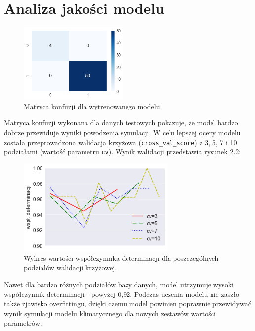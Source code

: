 \documentclass[11pt, a4paper, notitlepage]{report}
\begin{document}
\section{Analiza jakości modelu}
\begin{figure}[H]
	\centering
	\captionsetup{justification=centering}
	\includegraphics[width=200px]{graphics/conf_matrix}
	\caption{Matryca konfuzji dla wytrenowanego modelu.}
\end{figure}\par
Matryca konfuzji wykonana dla danych testowych pokazuje, że model bardzo dobrze przewiduje wyniki powodzenia symulacji. W celu lepszej oceny modelu została przeprowadzona walidacja krzyżowa (\verb|cross_val_score|) z 3, 5, 7 i 10 podziałami (wartość parametru \verb|cv|). Wynik walidacji przedstawia rysunek 2.2:\par
\begin{figure}[H]
	\centering
	\captionsetup{justification=centering}
	\includegraphics[width=290px]{graphics/cross_val}
	\caption{Wykres wartości współczynnika determinacji dla poszczególnych podziałów walidacji krzyżowej.}
\end{figure}\par
Nawet dla bardzo różnych podziałów bazy danych, model utrzymuje wysoki współczynnik determinacji - powyżej 0,92. Podczas uczenia modelu nie zaszło także zjawisko overfittingu, dzięki czemu model powinien poprawnie przewidywać wynik symulacji modelu klimatycznego dla nowych zestawów wartości parametrów.
\end{document}
